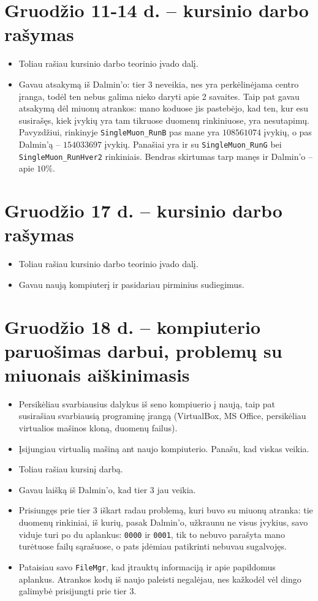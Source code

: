 \documentclass[a4paper, 12pt]{article}
\newcommand{\ttt}[1]{\texttt{#1}}
\begin{document}
\section{Gruodžio 11-14 d. -- kursinio darbo rašymas}
\begin{itemize}
	\item Toliau rašiau kursinio darbo teorinio įvado dalį.
	\item Gavau atsakymą iš Dalmin'o: tier 3 neveikia, nes yra perkėlinėjama centro įranga, todėl ten nebus galima nieko daryti apie
	2 savaites.
	Taip pat gavau atsakymą dėl miuonų atrankos: mano koduose jis pastebėjo, kad ten, kur esu susirašęs, kiek įvykių yra tam tikruose
	duomenų rinkiniuose, yra nesutapimų. Pavyzdžiui, rinkinyje \ttt{SingleMuon\_RunB} pas mane yra $108561074$ įvykių, o pas Dalmin'ą --
	$154033697$ įvykių. Panašiai yra ir su \ttt{SingleMuon\_RunG} bei \ttt{SingleMuon\_RunHver2} rinkiniais. Bendras skirtumas tarp
	manęs ir Dalmin'o -- apie $10\%$.
\end{itemize}

\section{Gruodžio 17 d. -- kursinio darbo rašymas}
\begin{itemize}
	\item Toliau rašiau kursinio darbo teorinio įvado dalį.
	\item Gavau naują kompiuterį ir pasidariau pirminius sudiegimus.
\end{itemize}

\section{Gruodžio 18 d. -- kompiuterio paruošimas darbui, problemų su miuonais aiškinimasis}
\begin{itemize}
	\item Persikėliau svarbiausius dalykus iš seno kompiuerio į naują, taip pat susirašiau svarbiausią programinę įrangą (VirtualBox,
	MS Office, persikėliau virtualios mašinos kloną, duomenų failus).
	\item Įsijungiau virtualią mašiną ant naujo kompiuterio. Panašu, kad viskas veikia.
	\item Toliau rašiau kursinį darbą.
	\item Gavau laišką iš Dalmin'o, kad tier 3 jau veikia.
	\item Prisiungęs prie tier 3 iškart radau problemą, kuri buvo su miuonų atranka: tie duomenų rinkiniai, iš kurių, pasak Dalmin'o,
	užkraunu ne visus įvykius, savo viduje turi po du aplankus: \ttt{0000} ir \ttt{0001}, tik to nebuvo parašyta mano turėtuose
	failų sąrašuose, o pats įdėmiau patikrinti nebuvau sugalvojęs.
	\item Pataisiau savo \ttt{FileMgr}, kad įtrauktų informaciją ir apie papildomus aplankus. Atrankos kodų iš naujo paleisti negalėjau,
	nes kažkodėl vėl dingo galimybė prisijungti prie tier 3.
\end{itemize}
\end{document}

